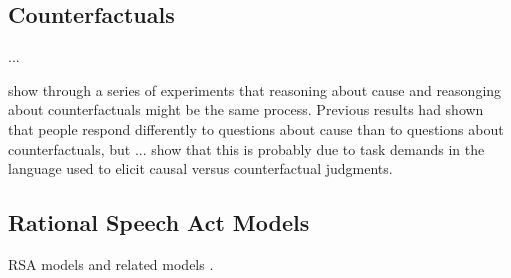 \documentclass[10pt,letterpaper]{article}
\begin{document}
\subsection{Counterfactuals}

 ...


 show through a series of experiments that reasoning about cause and reasonging about counterfactuals might be the same process. Previous results had shown that people respond differently to questions about cause than to questions about counterfactuals, but ... show that this is probably due to task demands in the language used to elicit causal versus counterfactual judgments.

\subsection{Rational Speech Act Models}

RSA models \cite{FrankGoodman2012, GoodmanStuhlmuller2013} and related models \cite{Franke2011, Russell2012}.



\setlength{\bibleftmargin}{.125in}
\setlength{\bibindent}{-\bibleftmargin}


\end{document}
